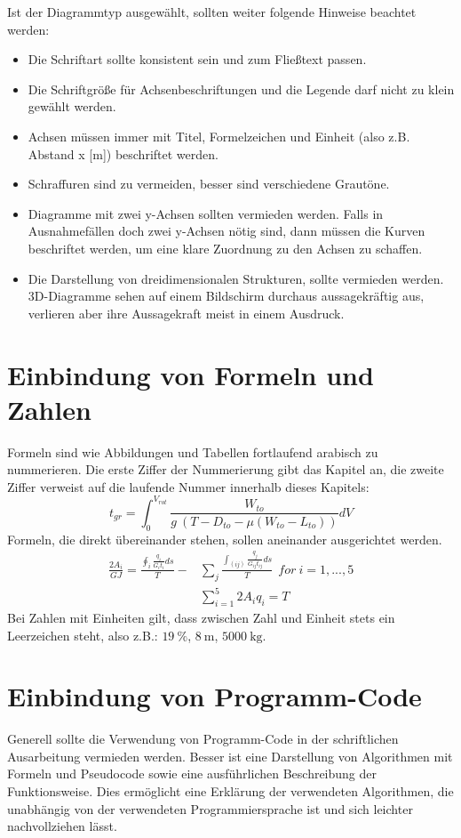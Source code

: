 \documentclass[utf8, a4paper, 11pt, parskip, pointlessnumbers]{scrreprt}
\begin{document}
Ist der Diagrammtyp ausgewählt, sollten weiter folgende Hinweise beachtet werden:
\begin{itemize}
\item Die Schriftart sollte konsistent sein und zum Fließtext passen.
 \item Die Schriftgröße für Achsenbeschriftungen und die Legende darf nicht zu klein gewählt werden.
\item Achsen müssen immer mit Titel, Formelzeichen und Einheit (also z.B. Abstand x [m]) beschriftet werden.
\item Schraffuren sind zu vermeiden, besser sind verschiedene Grautöne. 
\item Diagramme mit zwei y-Achsen sollten vermieden werden. Falls in Ausnahmefällen doch zwei y-Achsen nötig sind, dann müssen die Kurven beschriftet werden, um eine klare Zuordnung zu den Achsen zu schaffen.
\item Die Darstellung von dreidimensionalen Strukturen, sollte vermieden werden. 3D-Diagramme sehen auf einem Bildschirm durchaus aussagekräftig aus, verlieren aber ihre Aussagekraft meist in einem Ausdruck.
\end{itemize}

\section{Einbindung von Formeln und Zahlen}
Formeln sind wie Abbildungen und Tabellen fortlaufend arabisch zu nummerieren. Die erste Ziffer der Nummerierung gibt das Kapitel an, die zweite Ziffer verweist auf die laufende Nummer innerhalb dieses Kapitels:
\begin{equation}
t_{gr} = \int_0^{V_{rot}} \frac{W_{to}}{g~(T-D_{to}-\mu(W_{to}-L_{to}))} dV\label{eq:xgroundroll}
\end{equation}
Formeln, die direkt übereinander stehen, sollen aneinander ausgerichtet werden.
\begin{align}
\frac{2 A_i}{GJ} = \frac{\oint_{i} \frac{q_i}{G_i t_i} ds}{T}-&\sum\limits_{j} \frac{\int_{(ij)} \frac{q_j}{G_ {ij} t_{ij}} ds}{T} ~~for ~i = 1,...,5 \label{eq:Torsion1}\\
&\sum\limits_{i=1}^5 2 A_i q_i = T \label{eq:Torsion2}
\end{align}
Bei Zahlen mit Einheiten gilt, dass zwischen Zahl und Einheit stets ein Leerzeichen steht, also z.B.: $19~\si{\percent}$, $8~\si{\metre}$, $5000~\si{\kilo\gram}$.

\section{Einbindung von Programm-Code}
Generell sollte die Verwendung von Programm-Code in der schriftlichen Ausarbeitung vermieden werden. Besser ist eine Darstellung von Algorithmen mit Formeln und Pseudocode sowie eine ausführlichen Beschreibung der Funktionsweise. Dies ermöglicht eine Erklärung der verwendeten Algorithmen, die unabhängig von der verwendeten Programmiersprache ist und sich leichter nachvollziehen lässt.
\end{document}
